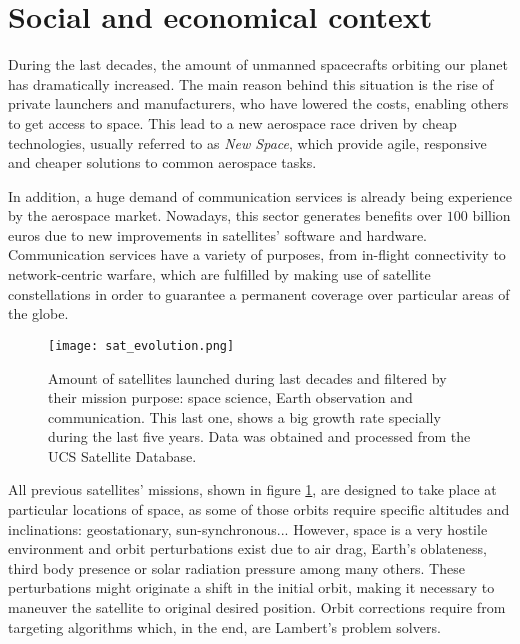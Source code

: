 \section{Social and economical context}

During the last decades, the amount of unmanned spacecrafts orbiting our planet
has dramatically increased. The main reason behind this situation is the rise of
private launchers and manufacturers, who have lowered the costs, enabling others
to get access to space. This lead to a new aerospace race driven by cheap
technologies, usually referred to as \textit{New Space}, which provide agile,
responsive and cheaper solutions to common aerospace tasks.

In addition, a huge demand of communication services is already being experience
by the aerospace market.  Nowadays, this sector generates benefits over $100$
billion euros due to new improvements in satellites' software and hardware.
Communication services have a variety of purposes, from in-flight connectivity
to network-centric warfare, which are fulfilled by making use of satellite
constellations in order to guarantee a permanent coverage over particular areas
of the globe.


\begin{figure}[h]
  \centering
  \texttt{[image: sat\_evolution.png]}
  \caption{Amount of satellites launched during last decades and filtered by their
    mission purpose: space science, Earth observation and communication. This
    last one, shows a big growth rate specially during the last five years. Data
    was obtained and processed from the UCS Satellite Database.}
  \label{fig:sat_evolution}
\end{figure}

All previous satellites' missions, shown in figure \ref{fig:sat_evolution}, are
designed to take place at particular locations of space, as some of those orbits
require specific altitudes and inclinations: geostationary, sun-synchronous...
However, space is a very hostile environment and orbit perturbations exist due
to air drag, Earth's oblateness, third body presence or solar radiation pressure
among many others. These perturbations might originate a shift in the initial
orbit, making it necessary to maneuver the satellite to original desired
position. Orbit corrections require from targeting algorithms which, in the end,
are Lambert's problem solvers.

